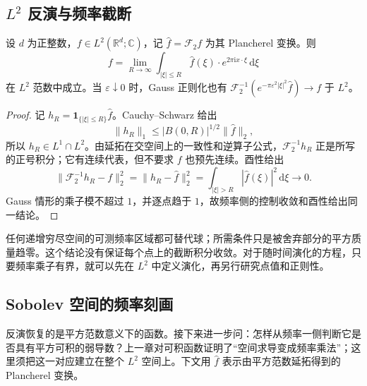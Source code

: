 \subsection{\texorpdfstring{\(L^2\)}{L²} 反演与频率截断}
\label{b2:subsec:040104}

\begin{corollary}\label{b2:cor:04-l2-inversion}
设 \(d\) 为正整数，\(f\in L^2(\mathbb R^d;\mathbb C)\)，记 \(\widehat f=\mathcal F_2f\) 为其 Plancherel 变换。则
\[
 f=\lim_{R\to\infty}\int_{|\xi|\leq R}\widehat f(\xi)\cdot e^{2\pi\mathrm{i}x\cdot\xi}\,\mathrm{d}\xi
\]
在 \(L^2\) 范数中成立。当 \(\varepsilon\downarrow0\) 时，Gauss 正则化也有 \(\mathcal F_2^{-1}(e^{-\pi\varepsilon^2|\xi|^2}\widehat f)\to f\) 于 \(L^2\)。
\end{corollary}
\begin{proof}
记 \(h_R=\mathbf1_{\{|\xi|\leq R\}}\widehat f\)。Cauchy--Schwarz 给出
\[
 \|h_R\|_1\leq |B(0,R)|^{1/2}\|\widehat f\|_2,
\]
所以 \(h_R\in L^1\cap L^2\)。由延拓在交空间上的一致性和逆算子公式，\(\mathcal F_2^{-1}h_R\) 正是所写的正号积分；它有连续代表，但不要求 \(f\) 也预先连续。酉性给出
\[
 \|\mathcal F_2^{-1}h_R-f\|_2^2
 =\|h_R-\widehat f\|_2^2
 =\int_{|\xi|>R}|\widehat f(\xi)|^2\,\mathrm{d}\xi\longrightarrow0.
\]
Gauss 情形的乘子模不超过 \(1\)，并逐点趋于 \(1\)，故频率侧的控制收敛和酉性给出同一结论。
\end{proof}

任何递增穷尽空间的可测频率区域都可替代球；所需条件只是被舍弃部分的平方质量趋零。这个结论没有保证每个点上的截断积分收敛。对于随时间演化的方程，只要频率乘子有界，就可以先在 \(L^2\) 中定义演化，再另行研究点值和正则性。



\subsection{Sobolev 空间的频率刻画}
\label{b2:subsec:040105}

反演恢复的是平方范数意义下的函数。接下来进一步问：怎样从频率一侧判断它是否具有平方可积的弱导数？上一章对可积函数证明了“空间求导变成频率乘法”；这里须把这一对应建立在整个 \(L^2\) 空间上。下文用 \(\widehat f\) 表示由平方范数延拓得到的 Plancherel 变换。

